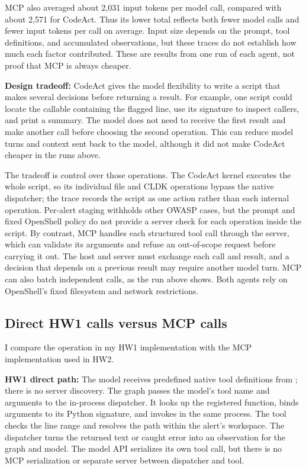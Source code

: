 \documentclass[11pt,letterpaper]{article}
\newcommand{\code}[1]{\texttt{\detokenize{#1}}}
\begin{document}
MCP also averaged about 2,031 input tokens per model call, compared with about 2,571 for CodeAct. Thus its lower total reflects both fewer model calls and fewer input tokens per call on average. Input size depends on the prompt, tool definitions, and accumulated observations, but these traces do not establish how much each factor contributed. These are results from one run of each agent, not proof that MCP is always cheaper.

\clearpage
\textbf{Design tradeoff:} CodeAct gives the model flexibility to write a script that makes several decisions before returning a result. For example, one script could locate the callable containing the flagged line, use its signature to inspect callers, and print a summary. The model does not need to receive the first result and make another call before choosing the second operation. This can reduce model turns and context sent back to the model, although it did not make CodeAct cheaper in the runs above.

The tradeoff is control over those operations. The CodeAct kernel executes the whole script, so its individual file and CLDK operations bypass the native dispatcher; the trace records the script as one action rather than each internal operation. Per-alert staging withholds other OWASP cases, but the prompt and fixed OpenShell policy do not provide a server check for each operation inside the script. By contrast, MCP handles each structured tool call through the server, which can validate its arguments and refuse an out-of-scope request before carrying it out. The host and server must exchange each call and result, and a decision that depends on a previous result may require another model turn. MCP can also batch independent calls, as the run above shows. Both agents rely on OpenShell's fixed filesystem and network restrictions.

\subsection*{Direct HW1 calls versus MCP calls}

I compare the \code{read_file} operation in my HW1 implementation with the MCP implementation used in HW2.

\textbf{HW1 direct path:} The model receives predefined native tool definitions from \code{ToolBundle}; there is no server discovery. The graph passes the model's tool name and arguments to the in-process dispatcher. It looks up the registered function, binds arguments to its Python signature, and invokes \code{read_file} in the same process. The tool checks the line range and resolves the path within the alert's workspace. The dispatcher turns the returned text or caught error into an observation for the graph and model. The model API serializes its own tool call, but there is no MCP serialization or separate server between dispatcher and tool.
\end{document}
